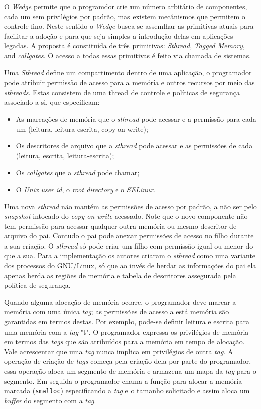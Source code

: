 O \emph{Wedge} permite que o programdor crie um número arbitário de
componentes, cada um sem privilégios por padrão, mas existem mecânismos que
permitem o controle fino. Neste sentido o \emph{Wedge} busca se assemlhar as
primitivas atuais para facilitar a adoção e para que seja simples a introdução
delas em aplicações legadas. A proposta é constituída de três primitivas:
\emph{Sthread}, \emph{Tagged Memory}, and \emph{callgates}. O acesso a todas
essas primitivas é feito via chamada de sistemas.

Uma \emph{Sthread} define um compartimento dentro de uma aplicação, o
programador pode atribuir permissão de acesso para a memória e outros recursos
por meio das \emph{sthreads}. Estas consistem de uma thread de controle e
políticas de segurança associado a si, que especificam:

\begin{itemize}
	\item As marcações de memória que o \emph{sthread} pode acessar e a permissão
				para cada um (leitura, leitura-escrita, copy-on-write);
	\item Os descritores de arquivo que a \emph{sthread} pode acessar e as
				permissões de cada (leitura, escrita, leitura-escrita);
	\item Os \emph{callgates} que a \emph{sthread} pode chamar;
	\item O \emph{Unix user id}, o \emph{root directory} e o \emph{SELinux}.
\end{itemize}

Uma nova \emph{sthread} não mantém as permissões de acesso por padrão, a não
ser pelo \emph{snapshot} intocado do \emph{copy-on-write} acessado. Note que o
novo componente não tem permissão para acessar qualquer outra memória ou mesmo
descritor de arquivo do pai. Contudo o pai pode anexar permissões de acesso no
filho durante a sua criação. O \emph{sthread} só pode criar um filho com
permissão igual ou menor do que a sua. Para a implementação os autores criaram
o \emph{sthread} como uma variante dos processos do GNU/Linux, só que ao invés
de herdar as informações do pai ela apenas herda as regiões de memória e tabela
de descritores assegurada pela política de segurança.

Quando alguma alocação de memória ocorre, o programador deve marcar a memória
com uma única \emph{tag}; as permissões de acesso a está memória são garantidas
em termos destas. Por exemplo, pode-se definir leitura e escrita para uma
memória com a \emph{tag} "t". O programador expressa os privilégios de memória
em termos das \emph{tags} que são atribuídos para a memória em tempo de
alocação. Vale acrescentar que uma \emph{tag} nunca implica em privilégios de
outra \emph{tag}. A operação de criação de \emph{tags} começa pela criação dela
por parte do programador, essa operação aloca um segmento de memória e armazena
um mapa da \emph{tag} para o segmento. Em seguida o programador chama a função
para alocar a memória marcada (\texttt{smalloc}) especificando a \emph{tag} e o
tamanho solicitado e assim aloca um \emph{buffer} do segmento com a \emph{tag}.

